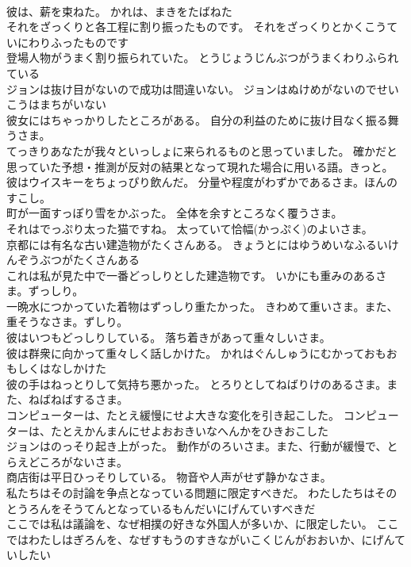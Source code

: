 \documentclass[8pt]{extreport}
\begin{document}
\begin{CJK}{UTF8}{min}
\\	彼は、薪を束ねた。	かれは、まきをたばねた 
\\	それをざっくりと各工程に割り振ったものです。	それをざっくりとかくこうていにわりふったものです 
\\	登場人物がうまく割り振られていた。	とうじょうじんぶつがうまくわりふられている 
\\	ジョンは抜け目がないので成功は間違いない。	ジョンはぬけめがないのでせいこうはまちがいない 
\\	彼女にはちゃっかりしたところがある。	自分の利益のために抜け目なく振る舞うさま。
\\	てっきりあなたが我々といっしょに来られるものと思っていました。	確かだと思っていた予想・推測が反対の結果となって現れた場合に用いる語。きっと。
\\	彼はウイスキーをちょっぴり飲んだ。	分量や程度がわずかであるさま。ほんのすこし。
\\	町が一面すっぽり雪をかぶった。	全体を余すところなく覆うさま。
\\	それはでっぷり太った猫ですね。	太っていて恰幅(かっぷく)のよいさま。
\\	京都には有名な古い建造物がたくさんある。	きょうとにはゆうめいなふるいけんぞうぶつがたくさんある 
\\	これは私が見た中で一番どっしりとした建造物です。	いかにも重みのあるさま。ずっしり。
\\	一晩水につかっていた着物はずっしり重たかった。	きわめて重いさま。また、重そうなさま。ずしり。
\\	彼はいつもどっしりしている。	落ち着きがあって重々しいさま。
\\	彼は群衆に向かって重々しく話しかけた。	かれはぐんしゅうにむかっておもおもしくはなしかけた 
\\	彼の手はねっとりして気持ち悪かった。	とろりとしてねばりけのあるさま。また、ねばねばするさま。
\\	コンピューターは、たとえ緩慢にせよ大きな変化を引き起こした。	コンピューターは、たとえかんまんにせよおおきいなへんかをひきおこした 
\\	ジョンはのっそり起き上がった。	動作がのろいさま。また、行動が緩慢で、とらえどころがないさま。
\\	商店街は平日ひっそりしている。	物音や人声がせず静かなさま。
\\	私たちはその討論を争点となっている問題に限定すべきだ。	わたしたちはそのとうろんをそうてんとなっているもんだいにげんていすべきだ 
\\	ここでは私は議論を、なぜ相撲の好きな外国人が多いか、に限定したい。	ここではわたしはぎろんを、なぜすもうのすきながいこくじんがおおいか、にげんていしたい 

\end{CJK}
\end{document}
